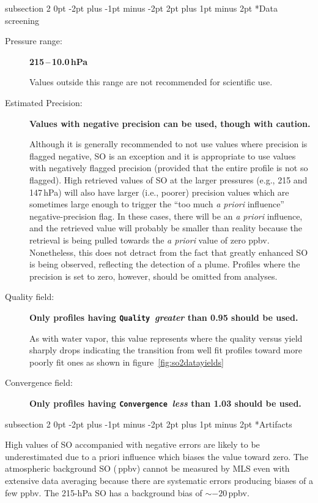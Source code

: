 \documentclass[11pt,draft]{report}
\makeatletter
\renewcommand{\subsection}{\@startsection%
  {subsection}%
  {2}%
  {0pt}%
  {-2pt plus -1pt minus -2pt}%
  {2pt plus 1pt minus 2pt}%
  {\large\sffamily\fontseries{sb}\selectfont\flushleft\color{SectionColor}\figureversion{tabular}}}%
\newcommand{\screeningrule}[1]{\textbf{#1}\par}
\newcommand{\standardrangestatement}{Values outside this range are not
  recommended for scientific use.}
\makeatother
\begin{document}
\subsection*{Data screening}
\label{sec:SO2Screening}
\begin{description}
\item[Pressure range:] \screeningrule{215\,--\,10.0\,hPa} \standardrangestatement
\item[Estimated Precision:] \screeningrule{Values with negative
    precision can be used, though with caution.}

  Although it is generally recommended to not use values where precision
  is flagged negative, SO is an exception and it is appropriate to
  use values with negatively flagged precision (provided that the entire
  profile is not so flagged). High retrieved values of SO at the
  larger pressures (e.g., 215 and 147\,hPa) will also have larger (i.e.,
  poorer) precision values which are sometimes large enough to trigger
  the ``too much \emph{a priori} influence'' negative-precision flag. In
  these cases, there will be an \emph{a priori} influence, and the
  retrieved value will probably be smaller than reality because the
  retrieval is being pulled towards the \emph{a priori} value of zero
  ppbv. Nonetheless, this does not detract from the fact that greatly
  enhanced SO is being observed, reflecting the detection of a
  plume.  Profiles where the precision is set to zero, however, should
  be omitted from analyses.

\evenstatusrule
\item[Quality field:] \screeningrule{Only profiles having
    \texttt{Quality}\, \emph{greater} than 0.95 should be used.}  As
with water vapor, this value represents where the quality versus yield
  sharply drops indicating the transition from well fit profiles toward
  more poorly fit ones as shown in figure~\ref{fig:so2datayields}
\item[Convergence field:] \screeningrule{Only profiles having
    \texttt{Convergence}\, \emph{less} than 1.03 should be used.}
\end{description}

\subsection*{Artifacts}

High values of SO accompanied with negative errors are likely to be
underestimated due to a priori influence which biases the value toward
zero. The atmospheric background SO (\,ppbv) cannot
be measured by MLS even with extensive data averaging because there are
systematic errors producing biases of a few ppbv. The 215-hPa SO has
a background bias of $\sim-20\,$ppbv.
\end{document}
